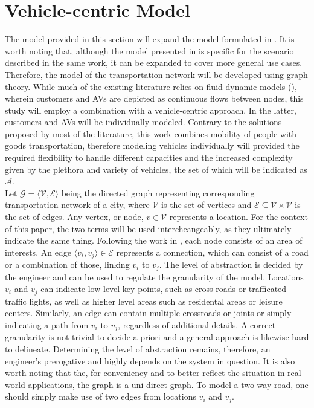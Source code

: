 \section{Vehicle-centric Model}\label{sec:vc_model}
The model provided in this section will expand the model formulated in \cite{project_thesis}. It is worth noting that, although the model presented in \cite{project_thesis} is specific for the scenario described in the same work, it can be expanded to cover more general use cases.
Therefore, the model of the transportation network will be developed using graph theory. While much of the existing literature relies on fluid-dynamic models (\cite{amod_review}), wherein customers and AVs are depicted as continuous flows between nodes, this study will employ a combination with a vehicle-centric approach. In the latter, customers and AVs will be individually modeled. Contrary to the solutions proposed by most of the literature, this work combines mobility of people with goods transportation, therefore modeling vehicles individually will provided the required flexibility to handle different capacities and the increased complexity given by the plethora and variety of vehicles, the set of which will be indicated as $\mathcal{A}$.  \\ 
Let $\mathcal{G} = \langle \mathcal{V}, \mathcal{E} \rangle$ being the directed graph representing corresponding transportation network of a city, where $\mathcal{V}$ is the set of vertices and $\mathcal{E} \subseteq \mathcal{V} \times \mathcal{V}$ is the set of edges. Any vertex, or node,  $ v \in  \mathcal{V}$ represents a location. For the context of this paper, the two terms will be used intercheangeably, as they ultimately indicate the same thing. Following the work in \cite{project_thesis}, each node consists of an area of interests. An edge $\langle v_i, v_j \rangle \in \mathcal{E}$ represents a connection, which can consist of a road or a combination of those, linking $v_i$ to $v_j$. The level of abstraction is decided by the engineer and can be used to regulate the granularity of the model. Locations $v_i$ and $v_j$ can indicate low level key points, such as cross roads or trafficated traffic lights, as well as higher level areas such as residental areas or leisure centers. Similarly, an edge can contain multiple crossroads or joints or simply indicating a path from $v_i$ to $v_j$, regardless of additional details. A correct granularity is not trivial to decide a priori and a general approach is likewise hard to delineate.  Determining the level of abstraction remains, therefore, an engineer's prerogative and highly depends on the system in question. It is also worth noting that the, for conveniency and to better reflect the situation in real world applications, the graph is a uni-direct graph. To model a two-way road, one should simply make use of two edges from locations $v_i$ and $v_j$. \\
